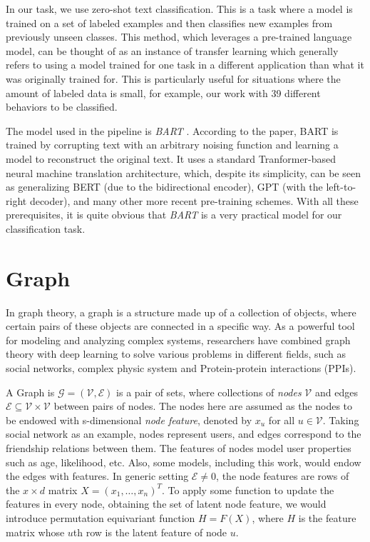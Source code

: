 In our task, we use zero-shot text classification. This is a task where a model is trained on a set of labeled examples and then classifies new examples from previously unseen classes. This method, which leverages a pre-trained language model, can be thought of as an instance of transfer learning which generally refers to using a model trained for one task in a different application than what it was originally trained for. This is particularly useful for situations where the amount of labeled data is small, for example, our work with 39 different behaviors to be classified.

The model used in the pipeline is \textit{BART} \cite{lewis2019bartdenoisingsequencetosequencepretraining}. According to the paper, BART is trained by corrupting text with an arbitrary noising function and learning a model to reconstruct the original text. It uses a standard Tranformer-based neural machine translation architecture, which, despite its simplicity, can be seen as generalizing BERT (due to the bidirectional encoder), GPT (with the left-to-right decoder), and many other more recent pre-training schemes. With all these prerequisites, it is quite obvious that \textit{BART} is a very practical model for our classification task.

\section{Graph}
\label{sec:graph}
In graph theory, a graph is a structure made up of a collection of objects, where certain pairs of these objects are connected in a specific way\cite{zhou2020graph}. As a powerful tool for modeling and analyzing complex systems, researchers have combined graph theory with deep learning to solve various problems in different fields, such as social networks\cite{wu2020graph}, complex physic system\cite{sanchez2018graph} and Protein-protein interactions (PPIs)\cite{NIPS2017_f5077839}.

A Graph is $\mathcal{G} = (\mathcal{V}, \mathcal{E})$ is a pair of sets, where collections of \textit{nodes} $\mathcal{V}$ and edges $\mathcal{E} \subseteq \mathcal{V}\times \mathcal{V}$ between pairs of nodes. The nodes here are assumed as the nodes to be endowed with s-dimensional \textit{node feature}, denoted by $x_u$ for all $u\in \mathcal{V}$. Taking social network as an example, nodes represent users, and edges correspond to the friendship relations between them. The features of nodes model user properties such as age, likelihood, etc. Also, some models, including this work, would endow the edges with features. In generic setting $\mathcal{E} \neq 0$, the node features are rows of the $x\times d$ matrix $X=(x_1,\ldots,x_n)^T$. To apply some function to update the features in every node, obtaining the set of latent node feature, we would introduce permutation equivariant function $H=F(X)$, where $H$ is the feature matrix whose $u$th row is the latent feature of node $u$.

